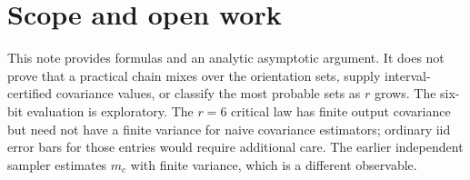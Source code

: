 \documentclass[11pt]{article}
\begin{document}
\section{Scope and open work}
This note provides formulas and an analytic asymptotic argument. It does
not prove that a practical chain mixes over the orientation sets, supply
interval-certified covariance values, or classify the most probable sets
as $r$ grows. The six-bit evaluation is exploratory. The $r=6$ critical law has finite output
covariance but need not have a finite variance for naive covariance
estimators; ordinary iid error bars for those entries would require
additional care. The earlier independent sampler estimates $m_c$ with
finite variance, which is a different observable.
\end{document}
